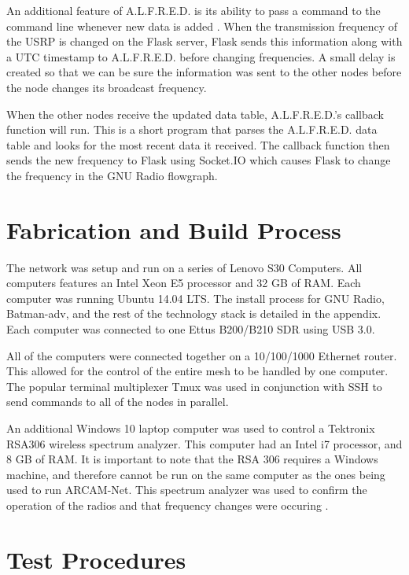  An additional feature of A.L.F.R.E.D. is its ability to pass a command to the command line whenever new data is added \cite{0015}. When the transmission frequency of the USRP is changed on the Flask server, Flask sends this information along with a UTC timestamp to A.L.F.R.E.D. before changing frequencies. A small delay is created so that we can be sure the information was sent to the other nodes before the node changes its broadcast frequency.  

 When the other nodes receive the updated data table, A.L.F.R.E.D.'s callback function will run. This is a short program that parses the A.L.F.R.E.D. data table and looks for the most recent data it received. The callback function then sends the new frequency to Flask using Socket.IO which causes Flask to change the frequency in the GNU Radio flowgraph.   

\section{Fabrication and Build Process}

The network was setup and run on a series of Lenovo S30 Computers. All computers features an Intel Xeon E5 processor and 32 GB of RAM. Each computer was running Ubuntu 14.04 LTS. The install process for GNU Radio, Batman-adv, and the rest of the technology stack is detailed in the appendix. Each computer was connected to one Ettus B200/B210 SDR using USB 3.0. 

All of the computers were connected together on a 10/100/1000 Ethernet router. This allowed for the control of the entire mesh to be handled by one computer. The popular terminal multiplexer Tmux was used in conjunction with SSH to send commands to all of the nodes in parallel. 

An additional Windows 10 laptop computer was used to control a Tektronix RSA306 wireless spectrum analyzer. This computer had an Intel i7 processor, and 8 GB of RAM. It is important to note that the RSA 306 requires a Windows machine, and therefore cannot be run on the same computer as the ones being used to run ARCAM-Net. This spectrum analyzer was used to confirm the operation of the radios and that frequency changes were occuring \cite{specan1}. 


\section{Test Procedures}

